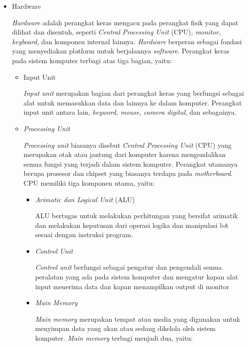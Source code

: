 \documentclass[12pt]{article}
\begin{document}
    \begin{itemize}
        \item Hardware
        \par
        \textit{Hardware} adalah perangkat keras mengacu pada perangkat fisik yang dapat dilihat dan disentuh, seperti \textit{Central Processing Unit }(CPU), \textit{monitor, keyboard,} dan komponen internal lainnya.\textit{ Hardware} berperan sebagai fondasi yang menyediakan pl\textit{a}tform untuk berjalannya \textit{software}. Perangkat keras pada sistem komputer terbagi atas tiga bagian, yaitu:
        \begin{itemize}
            \item Input Unit
            \par 
            \textit{Input unit} merupakan bagian dari perangkat keras yang berfungsi sebagai alat untuk memasukkan data dan lainnya ke dalam komputer. Perangkat input unit antara lain, \textit{keyword, mouse, camera digital}, dan sebagainya.
            \item \textit{Processing Unit}
            \par
            \textit{Processing unit} biasanya disebut \textit{Central Processing Unit} (CPU) yang merupakan otak atau jantung dari komputer karena mengendalikan semua fungsi yang terjadi dalam sistem komputer. Perangkat utamanya berupa prosesor dan chipset yang biasanya terdapa pada \textit{motherboard}. CPU memiliki tiga komponen utama, yaitu:
            \begin{itemize}
                \item \textit{Arimatic dan Logical Unit} (ALU)
                \par
                ALU bertugas untuk melakukan perhitungan yang bersifat arimatik dan melakukan keputusan dari operasi logika dan manipulasi b\textit{i}t sesuai dengan instruksi program.
                \item \textit{Control Unit}
                \par
                \textit{Control unit} berfungsi sebagai pengatur dan pengendali semua peralatan yang ada pada sistem komputer dan mengatur kapan alat input menerima data dan kapan menampilkan output di monitor
                \item \textit{Main Memory}
                \par
               \textit{ Main memory} merupakan tempat atau media yang digunakan untuk menyimpan data yang akan atau sedang dikelola oleh sistem komputer. \textit{Main memory } terbagi menjadi dua, yaitu:

\end{itemize}
\end{itemize}
\end{itemize}
\end{document}
